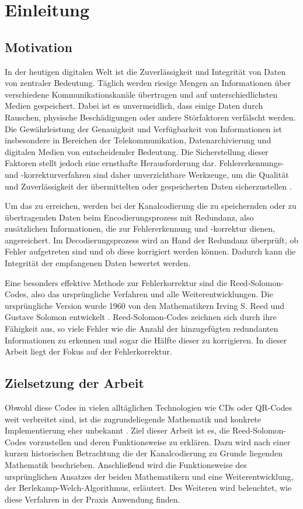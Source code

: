 \chapter{Einleitung}\label{ch:intro}

\section{Motivation}\label{sec:motivation}

In der heutigen digitalen Welt ist die Zuverlässigkeit und Integrität von Daten von zentraler Bedeutung. 
Täglich werden riesige Mengen an Informationen über verschiedene Kommunikationskanäle übertragen und auf unterschiedlichsten Medien gespeichert. 
Dabei ist es unvermeidlich, dass einige Daten durch Rauschen, physische Beschädigungen oder andere Störfaktoren verfälscht werden. 
Die Gewährleistung der Genauigkeit und Verfügbarkeit von Informationen ist insbesondere in Bereichen der Telekommunikation, Datenarchivierung und digitalen Medien von entscheidender Bedeutung. 
Die Sicherstellung dieser Faktoren stellt jedoch eine ernsthafte Herausforderung dar. 
Fehlererkennungs- und -korrekturverfahren sind daher unverzichtbare Werkzeuge, um die Qualität und Zuverlässigkeit der übermittelten oder gespeicherten Daten sicherzustellen \cite{petersonErrorcorrectingCodes1972}.

Um das zu erreichen, werden bei der Kanalcodierung die zu speichernden oder zu übertragenden Daten beim Encodierungsprozess mit Redundanz, also zusätzlichen Informationen, die zur Fehlererkennung und -korrektur dienen, angereichert. 
Im Decodierungsprozess wird an Hand der Redundanz überprüft, ob Fehler aufgetreten sind und ob diese korrigiert werden können. 
Dadurch kann die Integrität der empfangenen Daten bewertet werden.

Eine besonders effektive Methode zur Fehlerkorrektur sind die Reed-Solomon-Codes, also das ursprüngliche Verfahren und alle Weiterentwicklungen.
Die ursprüngliche Version wurde 1960 von den Mathematikern Irving S. Reed und Gustave Solomon entwickelt \cite{reedPolynomialCodesCertain1960}. 
Reed-Solomon-Codes zeichnen sich durch ihre Fähigkeit aus, so viele Fehler wie die Anzahl der hinzugefügten redundanten Informationen zu erkennen und sogar die Hälfte dieser zu korrigieren.
In dieser Arbeit liegt der Fokus auf der Fehlerkorrektur.

\section{Zielsetzung der Arbeit}\label{sec:objective}

Obwohl diese Codes in vielen alltäglichen Technologien wie CDs oder QR-Codes weit verbreitet sind, ist die zugrundeliegende Mathematik und konkrete Implementierung eher unbekannt \cite{wickerReedSolomonCodes1994}. 
Ziel dieser Arbeit ist es, die Reed-Solomon-Codes vorzustellen und deren Funktionsweise zu erklären. 
Dazu wird nach einer kurzen historischen Betrachtung die der Kanalcodierung zu Grunde liegenden Mathematik beschrieben.
Anschließend wird die Funktionsweise des ursprünglichen Ansatzes der beiden Mathematikern und eine Weiterentwicklung, der Berlekamp-Welch-Algorithmus, erläutert.
Des Weiteren wird beleuchtet, wie diese Verfahren in der Praxis Anwendung finden. 
